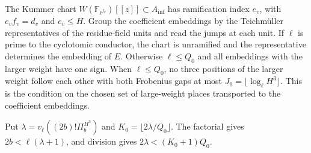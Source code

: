 The Kummer chart \(W(\mathbb F_{\ell^{f_v}})[[z]]\subset A_{\inf}\) has ramification
index \(e_v\), with \(e_v f_v=d_v\) and \(e_v\le H\).
Group the coefficient embeddings by the Teichmüller representatives of the residue-field units
and read the jumps at each unit. If \(\ell\) is prime to the cyclotomic conductor, the chart is
unramified and the representative determines the embedding of \(E\).
Otherwise \(\ell\le Q_0\) and all embeddings with the larger weight have one sign.
When \(\ell\le Q_0\), no three positions of the larger weight follow each other with both
Frobenius gaps at most \(J_0=\lfloor\log_\ell H^3\rfloor\). This is the condition on the
chosen set of large-weight places transported to the coefficient embeddings.

Put \(\lambda=v_\ell((2b)!\Pi_b^{H^3})\) and \(K_0=\lfloor2\lambda/Q_0\rfloor\).
The factorial gives \(2b<\ell(\lambda+1)\), and division gives \(2\lambda<(K_0+1)Q_0\).

